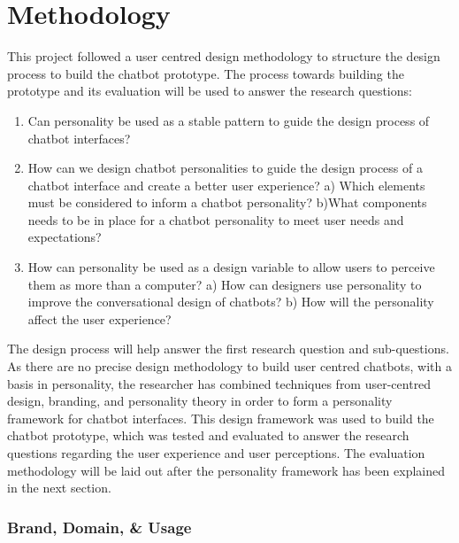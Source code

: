 \chapter{Methodology}
\label{chap:methodology}

This project followed a user centred design methodology to structure the design process to build the chatbot prototype. The process towards building the prototype and its evaluation will be used to answer the research questions:

\begin{enumerate}
    \item Can personality be used as a stable pattern to guide the design process of chatbot interfaces?
    \item How can we design chatbot personalities to guide the design process of a chatbot interface and create a better user experience? 
        \subitem a) Which elements must be considered to inform a chatbot personality?
        \subitem b)What components needs to be in place for a chatbot personality to meet user needs and expectations?
    \item How can personality be used as a design variable to allow users to perceive them as more than a computer?
        \subitem a) How can designers use personality to improve the conversational design of chatbots? %
        \subitem b) How will the personality affect the user experience? %
\end{enumerate}

The design process will help answer the first research question and sub-questions. As there are no precise design methodology to build user centred chatbots, with a basis in personality, the researcher has combined techniques from user-centred design, branding, and personality theory in order to form a personality framework for chatbot interfaces. This design framework was used to build the chatbot prototype, which was tested and evaluated to answer the research questions regarding the user experience and user perceptions. The evaluation methodology will be laid out after the personality framework has been explained in the next section.

\vspace{5mm} %

\subsection{Brand, Domain, \& Usage}

